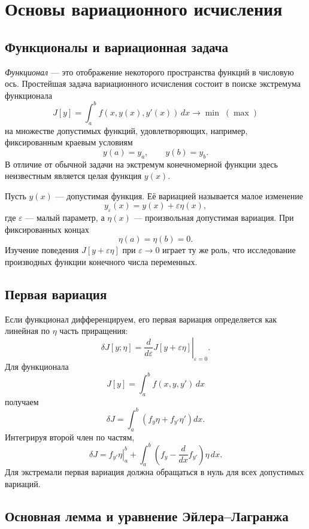 \section{Основы вариационного исчисления}
\label{sec:calculus-of-variations}

\subsection{Функционалы и вариационная задача}

\emph{Функционал} --- это отображение некоторого пространства функций в
числовую ось. Простейшая задача вариационного исчисления состоит в поиске
экстремума функционала
\[
    J[y]=\int_a^b f(x,y(x),y'(x))\,dx\longrightarrow \min\;(\max)
\]
на множестве допустимых функций, удовлетворяющих, например, фиксированным
краевым условиям
\[
    y(a)=y_a,\qquad y(b)=y_b.
\]
В отличие от обычной задачи на экстремум конечномерной функции здесь
неизвестным является целая функция $y(x)$.

Пусть $y(x)$ --- допустимая функция. Её вариацией называется малое изменение
\[
    y_\varepsilon(x)=y(x)+\varepsilon\eta(x),
\]
где $\varepsilon$ --- малый параметр, а $\eta(x)$ --- произвольная допустимая
вариация. При фиксированных концах
\[
    \eta(a)=\eta(b)=0.
\]
Изучение поведения $J[y+\varepsilon\eta]$ при $\varepsilon\to0$ играет ту же
роль, что исследование производных функции конечного числа переменных.

\subsection{Первая вариация}

Если функционал дифференцируем, его первая вариация определяется как линейная
по $\eta$ часть приращения:
\[
    \delta J[y;\eta]
    =\left.\frac{d}{d\varepsilon}J[y+\varepsilon\eta]
      \right|_{\varepsilon=0}.
\]
Для функционала
\[
    J[y]=\int_a^b f(x,y,y')\,dx
\]
получаем
\[
    \delta J
    =\int_a^b\left(f_y\eta+f_{y'}\eta'\right)dx.
\]
Интегрируя второй член по частям,
\[
    \delta J=
    \left.f_{y'}\eta\right|_a^b+
    \int_a^b\left(f_y-\frac{d}{dx}f_{y'}\right)\eta\,dx.
\]
Для экстремали первая вариация должна обращаться в нуль для всех допустимых
вариаций.

\subsection{Основная лемма и уравнение Эйлера--Лагранжа}

